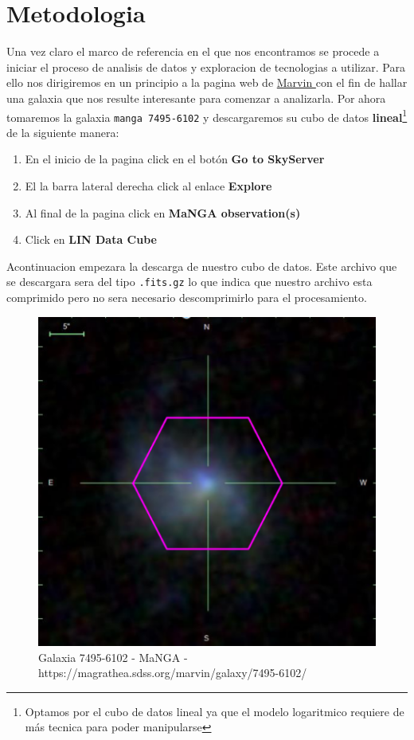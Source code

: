 \documentclass[9pt,twocolumn,a4paper]{opticajnl}
\begin{document}
\section*{Metodologia}
Una vez claro el marco de referencia en el que nos encontramos se procede a iniciar el proceso de analisis de datos y exploracion de tecnologias a utilizar. Para ello nos dirigiremos en un principio a la pagina web de \href{https://magrathea.sdss.org/marvin/}{Marvin } con el fin de hallar una galaxia que nos resulte interesante para comenzar a analizarla. Por ahora tomaremos la galaxia \verb|manga 7495-6102| y descargaremos su cubo de datos \textbf{lineal}\footnote{Optamos por el cubo de datos lineal ya que el modelo logaritmico requiere de más tecnica para poder manipularse} de la siguiente manera:
\begin{enumerate}
    \item En el inicio de la pagina click en el botón \textbf{Go to SkyServer}
    \item El la barra lateral derecha click al enlace \textbf{Explore}
    \item Al final de la pagina click en \textbf{MaNGA observation(s)}
    \item Click en \textbf{LIN Data Cube}
\end{enumerate}
Acontinuacion empezara la descarga de nuestro cubo de datos. Este archivo que se descargara sera del tipo \verb|.fits.gz| lo que indica que nuestro archivo esta comprimido pero no sera necesario descomprimirlo para el procesamiento.


\begin{figure}
    \centering
    \includegraphics[width=0.8\linewidth]{manga-7495-6102.png}
    \caption{Galaxia 7495-6102 - MaNGA - https://magrathea.sdss.org/marvin/galaxy/7495-6102/}
    \label{fig:interfacemarvin}
\end{figure}
 
\end{document}
